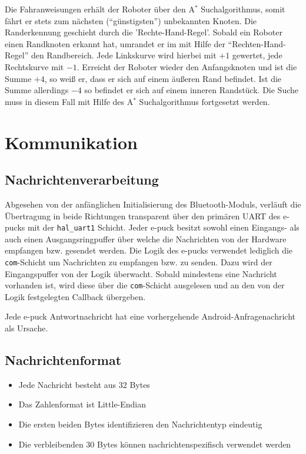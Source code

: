 \documentclass[10pt,a4paper]{article}
\begin{document}
  			Die Fahranweisungen erhält der Roboter über den A$^\ast$ Suchalgorithmus, somit fährt er stets zum nächsten (``günstigsten'') unbekannten
  			Knoten. Die Randerkennung geschieht durch die 'Rechte-Hand-Regel'. Sobald ein Roboter einen Randknoten erkannt hat, umrandet er im
			mit Hilfe der ``Rechten-Hand-Regel'' den Randbereich. Jede Linkskurve wird hierbei mit $+1$ gewertet, jede Rechtskurve mit $-1$. Erreicht der Roboter wieder
			den Anfangsknoten und ist die Summe $+4$, so weiß er, dass er sich auf einem äußeren Rand befindet. Ist die Summe allerdings $-4$
			so befindet er sich auf einem inneren Randstück. Die Suche muss in diesem Fall mit Hilfe des A$^\ast$ Suchalgorithmus fortgesetzt werden.	
	\section{Kommunikation}
		\subsection{Nachrichtenverarbeitung}
			{Abgesehen von der anfänglichen Initialisierung des Bluetooth-Moduls, verläuft die Übertragung in beide
			Richtungen transparent über den primären UART des e-pucks mit der {\tt hal\_uart1} Schicht. Jeder e-puck besitzt
			sowohl einen Eingangs- als auch	einen Ausgangsringpuffer über welche die Nachrichten von der Hardware empfangen
			bzw. gesendet werden. Die Logik des e-pucks verwendet lediglich die {\tt com}-Schicht um Nachrichten zu
			empfangen bzw. zu senden. Dazu wird der Eingangspuffer von der Logik überwacht. Sobald mindestens eine Nachricht
			vorhanden ist, wird diese über die	{\tt com}-Schicht ausgelesen und an den von der Logik festgelegten Callback
			übergeben.

			Jede e-puck Antwortnachricht hat eine vorhergehende Android-Anfragenachricht als Ursache.}
		\subsection{Nachrichtenformat}
			\begin{itemize}
				\item Jede Nachricht besteht aus 32 Bytes
				\item Das Zahlenformat ist Little-Endian
				\item Die ersten beiden Bytes identifizieren den Nachrichtentyp eindeutig
				\item Die verbleibenden 30 Bytes können nachrichtenspezifisch verwendet werden
			\end{itemize}
\end{document}
